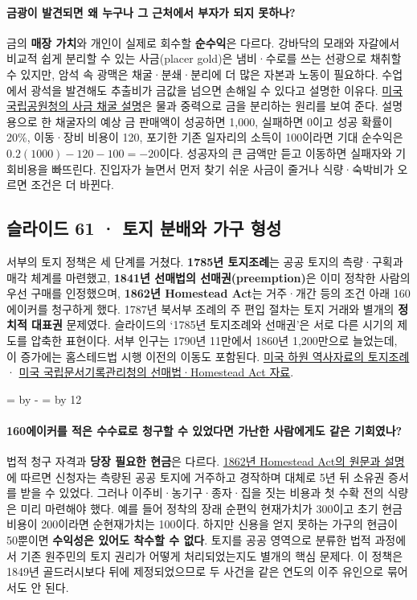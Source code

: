 \documentclass[10pt,a4paper]{article}
\newcommand{\ReserveQuestionSpace}{%
  \par\begingroup
  \dimen0=\pagegoal \advance\dimen0 by -\pagetotal
  \dimen2=\baselineskip \multiply\dimen2 by 12
  \ifdim\dimen0<\dimen2 \newpage\fi
  \endgroup}
\begin{document}
\paragraph{금광이 발견되면 왜 누구나 그 근처에서 부자가 되지 못하나?}
금의 \textbf{매장 가치}와 개인이 실제로 회수할 \textbf{순수익}은 다르다. 강바닥의 모래와 자갈에서 비교적 쉽게 분리할 수 있는 사금(placer gold)은 냄비·수로를 쓰는 선광으로 채취할 수 있지만, 암석 속 광맥은 채굴·분쇄·분리에 더 많은 자본과 노동이 필요하다. 수업에서 광석을 발견해도 추출비가 금값을 넘으면 손해일 수 있다고 설명한 이유다. \href{https://www.nps.gov/yuch/learn/historyculture/placer-mining.htm}{미국 국립공원청의 사금 채굴 설명}은 물과 중력으로 금을 분리하는 원리를 보여 준다. 설명용으로 한 채굴자의 예상 금 판매액이 성공하면 1,000, 실패하면 0이고 성공 확률이 20\%, 이동·장비 비용이 120, 포기한 기존 일자리의 소득이 100이라면 기대 순수익은 $0.2(1000)-120-100=-20$이다. 성공자의 큰 금액만 듣고 이동하면 실패자와 기회비용을 빠뜨린다. 진입자가 늘면서 먼저 찾기 쉬운 사금이 줄거나 식량·숙박비가 오르면 조건은 더 바뀐다.\par

\subsection{슬라이드 61 · 토지 분배와 가구 형성}
서부의 토지 정책은 세 단계를 거쳤다. \textbf{1785년 토지조례}는 공공 토지의 측량·구획과 매각 체계를 마련했고, \textbf{1841년 선매법의 선매권(preemption)}은 이미 정착한 사람의 우선 구매를 인정했으며, \textbf{1862년 Homestead Act}는 거주·개간 등의 조건 아래 160에이커를 청구하게 했다. 1787년 북서부 조례의 주 편입 절차는 토지 거래와 별개의 \textbf{정치적 대표권} 문제였다. 슬라이드의 ‘1785년 토지조례와 선매권’은 서로 다른 시기의 제도를 압축한 표현이다. 서부 인구는 1790년 11만에서 1860년 1,200만으로 늘었는데, 이 증가에는 홈스테드법 시행 이전의 이동도 포함된다. \href{https://history.house.gov/Records-and-Research/Listing/c\_110/}{미국 하원 역사자료의 토지조례} · \href{https://www.archives.gov/files/calendar/genealogy-fair/2014/handouts/session-11-handout-5of5-martinez-land-other-land-acts.pdf}{미국 국립문서기록관리청의 선매법·Homestead Act 자료}.\par

\ReserveQuestionSpace
\paragraph{160에이커를 적은 수수료로 청구할 수 있었다면 가난한 사람에게도 같은 기회였나?}
법적 청구 자격과 \textbf{당장 필요한 현금}은 다르다. \href{https://www.archives.gov/milestone-documents/homestead-act}{1862년 Homestead Act의 원문과 설명}에 따르면 신청자는 측량된 공공 토지에 거주하고 경작하며 대체로 5년 뒤 소유권 증서를 받을 수 있었다. 그러나 이주비·농기구·종자·집을 짓는 비용과 첫 수확 전의 식량은 미리 마련해야 했다. 예를 들어 정착의 장래 순편익 현재가치가 300이고 초기 현금 비용이 200이라면 순현재가치는 100이다. 하지만 신용을 얻지 못하는 가구의 현금이 50뿐이면 \textbf{수익성은 있어도 착수할 수 없다}. 토지를 공공 영역으로 분류한 법적 과정에서 기존 원주민의 토지 권리가 어떻게 처리되었는지도 별개의 핵심 문제다. 이 정책은 1849년 골드러시보다 뒤에 제정되었으므로 두 사건을 같은 연도의 이주 유인으로 묶어서도 안 된다.\par
\end{document}

